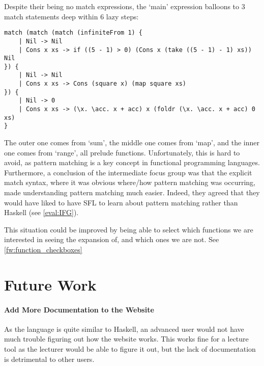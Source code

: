\noindent Despite their being no match expressions, the `main' expression balloons to 3 match statements deep within 6 lazy steps:

\begin{lstlisting}[language=SFL]
match (match (match (infiniteFrom 1) {
    | Nil -> Nil
    | Cons x xs -> if ((5 - 1) > 0) (Cons x (take ((5 - 1) - 1) xs)) Nil
}) {
    | Nil -> Nil
    | Cons x xs -> Cons (square x) (map square xs)
}) {
    | Nil -> 0
    | Cons x xs -> (\x. \acc. x + acc) x (foldr (\x. \acc. x + acc) 0 xs)
}
\end{lstlisting}

The outer one comes from `sum', the middle one comes from `map', and the inner one comes from `range', all prelude functions. Unfortunately, this is hard to avoid, as pattern matching is a key concept in functional programming languages. Furthermore, a conclusion of the intermediate focus group was that the explicit match syntax, where it was obvious where/how pattern matching was occurring, made understanding pattern matching much easier. Indeed, they agreed that they would have liked to have SFL to learn about pattern matching rather than Haskell (see \ref{eval:IFG}). 

This situation could be improved by being able to select which functions we are interested in seeing the expansion of, and which ones we are not. See \ref{fw:function_checkboxes}


\section{Future Work}
\label{conc:future_work}
\paragraph{Add More Documentation to the Website} As the language is quite similar to Haskell, an advanced user would not have much trouble figuring out how the website works. This works fine for a lecture tool as the lecturer would be able to figure it out, but the lack of documentation is detrimental to other users. 
